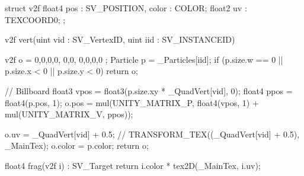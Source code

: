 \begin{hlsl}
struct v2f
{
    float4 pos : SV_POSITION, color : COLOR;
    float2 uv : TEXCOORD0;
};

v2f vert(uint vid : SV_VertexID, uint iid : SV_INSTANCEID)
{
    v2f o = { 0,0,0,0, 0,0, 0,0,0,0 };
    Particle p = _Particles[iid];
    if (p.size.w == 0 || p.size.x < 0 || p.size.y < 0) return o;
    
    // Billboard
    float3 vpos = float3(p.size.xy * _QuadVert[vid], 0);
    float4 ppos = float4(p.pos, 1);
    o.pos = mul(UNITY_MATRIX_P, float4(vpos, 1) + mul(UNITY_MATRIX_V, ppos));
    
    o.uv = _QuadVert[vid] + 0.5;  // TRANSFORM_TEX((_QuadVert[vid] + 0.5), _MainTex);
    o.color = p.color;
    return o;
}

float4 frag(v2f i) : SV_Target { return i.color * tex2D(_MainTex, i.uv); }    
\end{hlsl}

